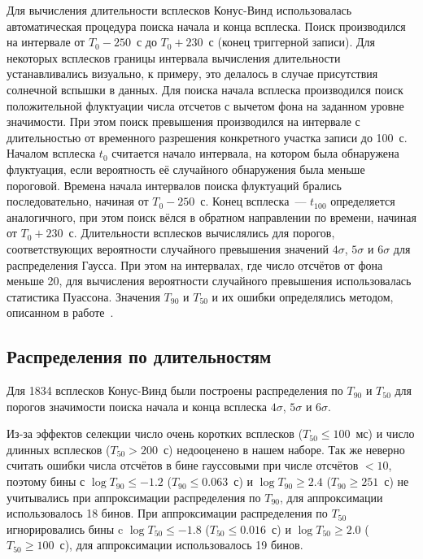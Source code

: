 Для вычисления длительности всплесков Конус-Винд использовалась автоматическая 
процедура поиска начала и конца всплеска. Поиск производился на интервале от 
$T_0-250$~с до $T_0+230$~с (конец триггерной записи). Для некоторых всплесков 
границы интервала вычисления длительности устанавливались визуально, к примеру, 
это делалось в случае присутствия солнечной вспышки в данных. Для поиска начала 
всплеска производился поиск положительной флуктуации числа отсчетов с вычетом 
фона на заданном уровне значимости. При этом поиск превышения производился на 
интервале с длительностью от временного разрешения конкретного участка записи до 100~с. 
Началом всплеска $t_0$ считается начало интервала, на котором была обнаружена флуктуация, 
если вероятность её случайного обнаружения была меньше пороговой. Времена начала 
интервалов поиска флуктуаций брались последовательно, начиная от $T_0-250$~с. 
Конец всплеска~--- $t_{100}$ определяется аналогичного, при этом поиск вёлся в 
обратном направлении по времени, начиная от $T_0 + 230$~с. Длительности всплесков 
вычислялись для порогов, соответствующих вероятности случайного превышения 
значений $4\sigma$, $5\sigma$ и $6\sigma$ для распределения Гаусса. При этом на 
интервалах, где число отсчётов от фона меньше 20, для вычисления вероятности 
случайного превышения использовалась статистика Пуассона. Значения $T_{90}$ и $T_{50}$ 
и их ошибки определялись методом, описанном в работе~\citep{Koshut_1996}. 

\subsection{Распределения по длительностям}
Для 1834 всплесков Конус-Винд были построены распределения по $T_{90}$ и $T_{50}$ 
для порогов значимости поиска начала и конца всплеска $4\sigma$, $5\sigma$ и $6\sigma$. 

Из-за эффектов селекции число очень коротких всплесков ($T_{50} \leq 100$~мс) и 
число длинных всплесков ($T_{50} > 200$~с) недооценено в нашем наборе. Так же неверно 
считать ошибки числа отсчётов в бине гауссовыми при числе отсчётов $<10$, поэтому 
бины с $\log T_{90} \leq-1.2$ ($T_{90} \leq 0.063$~с) и $\log T_{90} \geq 2.4$ ($T_{90} \geq 251$~с) 
не учитывались при аппроксимации распределения по $T_{90}$,  для аппроксимации 
использовалось 18 бинов. При аппроксимации распределения по $T_{50}$ игнорировались 
бины c $\log T_{50} \leq -1.8$ ($T_{50} \leq 0.016$~с) и  $\log T_{50} \geq 2.0$ 
($T_{50} \geq 100$~с), для аппроксимации использовалось 19 бинов.

